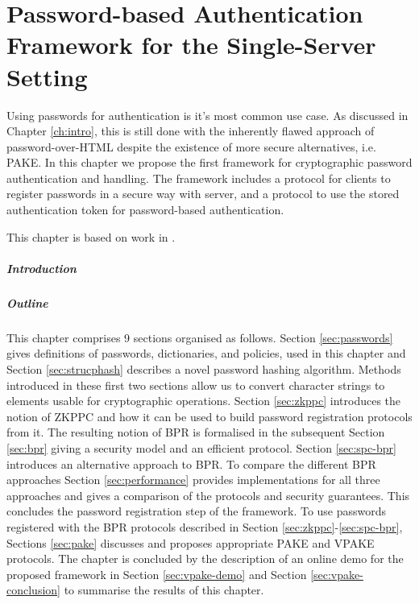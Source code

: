 \chapter[Password Authentication Framework for the Single-Server Setting]{Password-based Authentication Framework for the Single-Server Setting} \label{ch:vpake}

Using passwords for authentication is it's most common use case.
As discussed in Chapter \ref{ch:intro}, this is still done with the inherently flawed approach of password-over-\ac{HTML} despite the existence of more secure alternatives, i.e. \ac{PAKE}.
In this chapter we propose the first framework for cryptographic password authentication and handling.
The framework includes a protocol for clients to register passwords in a secure way with server, and a protocol to use the stored authentication token for password-based authentication.

\smallskip
\noindent
This chapter is based on work in \cite{Kiefer13a,KieferM15a,DongK15a}.

\paragraph{Introduction}

\paragraph{Outline}
This chapter comprises 9 sections organised as follows.
Section \ref{sec:passwords} gives definitions of passwords, dictionaries, and policies, used in this chapter and Section \ref{sec:strucphash} describes a novel password hashing algorithm.
Methods introduced in these first two sections allow us to convert character strings to elements usable for cryptographic operations.
Section \ref{sec:zkppc} introduces the notion of \ac{ZKPPC} and how it can be used to build password registration protocols from it.
The resulting notion of \ac{BPR} is formalised in the subsequent Section \ref{sec:bpr} giving a security model and an efficient protocol.
Section \ref{sec:spc-bpr} introduces an alternative approach to \ac{BPR}.
To compare the different \ac{BPR} approaches Section \ref{sec:performance} provides implementations for all three approaches and gives a comparison of the protocols and security guarantees.
This concludes the password registration step of the framework.
To use passwords registered with the \ac{BPR} protocols described in Section \ref{sec:zkppc}-\ref{sec:spc-bpr}, Sections \ref{sec:pake} discusses and proposes appropriate \ac{PAKE} and \ac{VPAKE} protocols.
The chapter is concluded by the description of an online demo for the proposed framework in Section \ref{sec:vpake-demo} and Section \ref{sec:vpake-conclusion} to summarise the results of this chapter.

